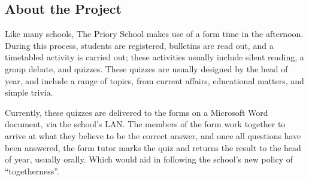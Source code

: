 \subsection{About the Project}
Like many schools, The Priory School makes use of a form time in the afternoon. During this process, students are registered, bulletins are read out, and a timetabled activity is carried out; these activities usually include silent reading, a group debate, and quizzes. These quizzes are usually designed by the head of year, and include a range of topics, from current affairs, educational matters, and simple trivia.

Currently, these quizzes are delivered to the forms on a Microsoft Word document, via the school's LAN. The members of the form work together to arrive at what they believe to be the correct answer, and once all questions have been answered, the form tutor marks the quiz and returns the result to the head of year, usually orally. Which would aid in following the school's new policy of ``togetherness''.
